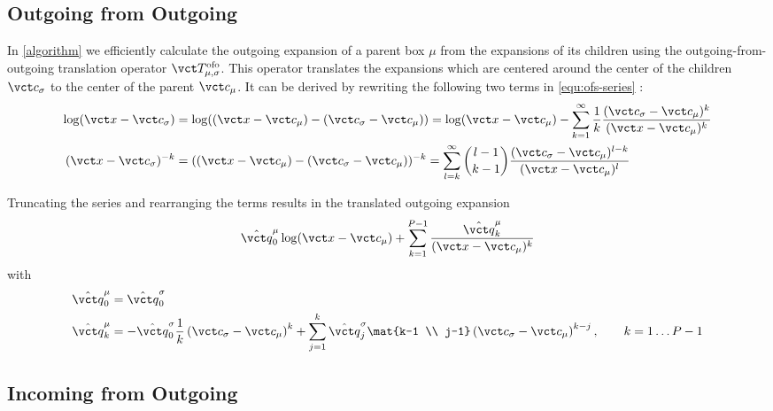 \subsection{Outgoing from Outgoing}

In \cref{algorithm} we efficiently calculate the outgoing expansion of a parent box $\mu$ from the expansions of its children using the outgoing-from-outgoing translation operator $\vct T_{\mu, \sigma}^\mathrm{ofo}$.
This operator translates the expansions which are centered around the center of the children $\vct c_\sigma$ to the center of the parent $\vct c_\mu$.
It can be derived by rewriting the following two terms in \cref{equ:ofs-series} \cite{short-course, Martinsson2015}:
\begin{align}
  \log(\vct x - \vct c_\sigma)
    &= \log((\vct x - \vct c_\mu) - (\vct c_\sigma - \vct c_\mu))
     = \log(\vct x - \vct c_\mu) - \sum_{k=1}^\infty \frac 1k \frac{(\vct c_\sigma - \vct c_\mu)^k}{(\vct x - \vct c_\mu)^k} \\
  (\vct x - \vct c_\sigma)^{-k}
    &= ((\vct x - \vct c_\mu) - (\vct c_\sigma - \vct c_\mu))^{-k}
     = \sum_{l=k}^\infty \binom{l-1}{k-1} \frac{(\vct c_\sigma - \vct c_\mu)^{l-k}}{(\vct x - \vct c_\mu)^l}
\end{align}

Truncating the series and rearranging the terms results in the translated outgoing expansion \cite{short-course, Martinsson2015}
\begin{equation}
   \hat{\vct q}_0^\mu \log(\vct x - \vct c_\mu) + \sum_{k=1}^{P-1} \frac{\hat{\vct q}_k^\mu}{(\vct x - \vct c_\mu)^k}
   \label{equ:ofo-series}
\end{equation}
with
\begin{equation}
  \begin{split}
    \hat{\vct q}_0^\mu &= \hat{\vct q}_{0}^{\sigma} \\
    \hat{\vct q}_k^\mu
      &= - \hat{\vct q}_{0}^{\sigma} \frac{1}{k} \left(\vct c_{\sigma}-\vct c_{\mu}\right)^{k}
         + \sum_{j=1}^{k} \hat{\vct q}_{j}^{\sigma} \mat{k-1 \\ j-1} \left(\vct c_{\sigma}-\vct c_{\mu}\right)^{k-j}, \qquad k = 1 \dots P-1
  \end{split}
\end{equation}

\subsection{Incoming from Outgoing}

